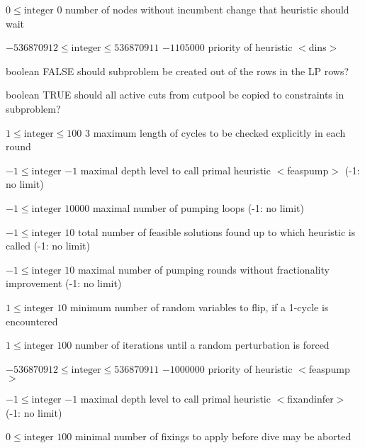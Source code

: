%
{$0\leq\textrm{integer}$}%
{$0$}%
{number of nodes without incumbent change that heuristic should wait}%
{}

%
{$-536870912\leq\textrm{integer}\leq536870911$}%
{$-1105000$}%
{priority of heuristic $<$dins$>$}%
{}

%
{boolean}%
{FALSE}%
{should subproblem be created out of the rows in the LP rows?}%
{}

%
{boolean}%
{TRUE}%
{should all active cuts from cutpool be copied to constraints in subproblem?}%
{}

%
{$1\leq\textrm{integer}\leq100$}%
{$3$}%
{maximum length of cycles to be checked explicitly in each round}%
{}

%
{$-1\leq\textrm{integer}$}%
{$-1$}%
{maximal depth level to call primal heuristic $<$feaspump$>$ (-1: no limit)}%
{}

%
{$-1\leq\textrm{integer}$}%
{$10000$}%
{maximal number of pumping loops (-1: no limit)}%
{}

%
{$-1\leq\textrm{integer}$}%
{$10$}%
{total number of feasible solutions found up to which heuristic is called (-1: no limit)}%
{}

%
{$-1\leq\textrm{integer}$}%
{$10$}%
{maximal number of pumping rounds without fractionality improvement (-1: no limit)}%
{}

%
{$1\leq\textrm{integer}$}%
{$10$}%
{minimum number of random variables to flip, if a 1-cycle is encountered}%
{}

%
{$1\leq\textrm{integer}$}%
{$100$}%
{number of iterations until a random perturbation is forced}%
{}

%
{$-536870912\leq\textrm{integer}\leq536870911$}%
{$-1000000$}%
{priority of heuristic $<$feaspump$>$}%
{}

%
{$-1\leq\textrm{integer}$}%
{$-1$}%
{maximal depth level to call primal heuristic $<$fixandinfer$>$ (-1: no limit)}%
{}

%
{$0\leq\textrm{integer}$}%
{$100$}%
{minimal number of fixings to apply before dive may be aborted}%
{}

